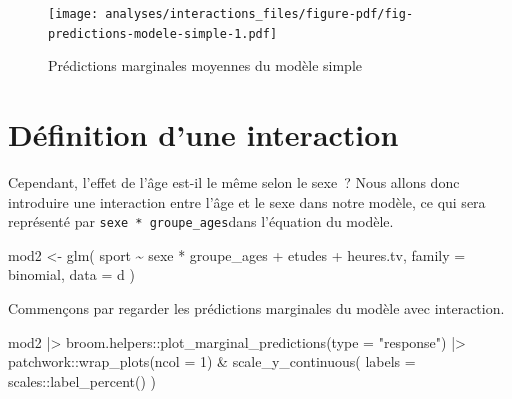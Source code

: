 \documentclass[
  letterpaper,
  DIV=11,
  numbers=noendperiod,
  oneside]{scrreprt}
\newenvironment{Shaded}{\begin{snugshade}}{\end{snugshade}}
\newcommand{\AttributeTok}[1]{\textcolor[rgb]{0.40,0.45,0.13}{#1}}
\newcommand{\DecValTok}[1]{\textcolor[rgb]{0.68,0.00,0.00}{#1}}
\newcommand{\FunctionTok}[1]{\textcolor[rgb]{0.28,0.35,0.67}{#1}}
\newcommand{\NormalTok}[1]{\textcolor[rgb]{0.00,0.23,0.31}{#1}}
\newcommand{\OtherTok}[1]{\textcolor[rgb]{0.00,0.23,0.31}{#1}}
\newcommand{\SpecialCharTok}[1]{\textcolor[rgb]{0.37,0.37,0.37}{#1}}
\newcommand{\StringTok}[1]{\textcolor[rgb]{0.13,0.47,0.30}{#1}}
\begin{document}
\begin{figure}[H]

{\centering \texttt{[image: analyses/interactions\_files/figure-pdf/fig-predictions-modele-simple-1.pdf]}

}

\caption{\label{fig-predictions-modele-simple}Prédictions marginales
moyennes du modèle simple}

\end{figure}

\hypertarget{duxe9finition-dune-interaction}{%
\section{Définition d'une
interaction}\label{duxe9finition-dune-interaction}}

Cependant, l'effet de l'âge est-il le même selon le sexe~? Nous allons
donc introduire une interaction entre l'âge et le sexe dans notre
modèle, ce qui sera représenté par \texttt{sexe\ *\ groupe\_ages}dans
l'équation du modèle.

\begin{Shaded}
\begin{Highlighting}[]
\NormalTok{mod2 }\OtherTok{\textless{}{-}} \FunctionTok{glm}\NormalTok{(}
\NormalTok{  sport }\SpecialCharTok{\textasciitilde{}}\NormalTok{ sexe }\SpecialCharTok{*}\NormalTok{ groupe\_ages }\SpecialCharTok{+}\NormalTok{ etudes }\SpecialCharTok{+}\NormalTok{ heures.tv,}
  \AttributeTok{family =}\NormalTok{ binomial,}
  \AttributeTok{data =}\NormalTok{ d}
\NormalTok{)}
\end{Highlighting}
\end{Shaded}

Commençons par regarder les prédictions marginales du modèle avec
interaction.

\begin{Shaded}
\begin{Highlighting}[]
\NormalTok{mod2 }\SpecialCharTok{|\textgreater{}} 
\NormalTok{  broom.helpers}\SpecialCharTok{::}\FunctionTok{plot\_marginal\_predictions}\NormalTok{(}\AttributeTok{type =} \StringTok{"response"}\NormalTok{) }\SpecialCharTok{|\textgreater{}} 
\NormalTok{  patchwork}\SpecialCharTok{::}\FunctionTok{wrap\_plots}\NormalTok{(}\AttributeTok{ncol =} \DecValTok{1}\NormalTok{) }\SpecialCharTok{\&}
  \FunctionTok{scale\_y\_continuous}\NormalTok{(}
    \AttributeTok{labels =}\NormalTok{ scales}\SpecialCharTok{::}\FunctionTok{label\_percent}\NormalTok{()}
\NormalTok{  )}
\end{Highlighting}
\end{Shaded}
\end{document}
